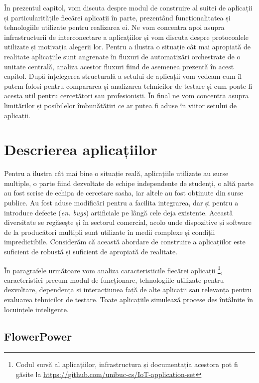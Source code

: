 În prezentul capitol, vom discuta despre modul de construire al suitei de aplicații și particularitățile fiecărei aplicații în parte, prezentând funcționalitatea și tehnologiile utilizate pentru realizarea ei. Ne vom concentra apoi asupra infrastructurii de interconectare a aplicațiilor și vom discuta despre protocoalele utilizate și motivația alegerii lor. Pentru a ilustra o situație cât mai apropiată de realitate aplicațiile sunt angrenate în fluxuri de automatizări orchestrate de o unitate centrală, analiza acestor fluxuri fiind de asemenea prezentă în acest capitol. După înțelegerea structurală a setului de aplicații vom vedeam cum îl putem folosi pentru compararea și analizarea tehnicilor de testare și cum poate fi acesta util pentru cercetători sau profesioniști. În final ne vom concentra asupra limitărilor și posibilelor îmbunătățiri ce ar putea fi aduse în viitor setului de aplicații.

\section{Descrierea aplicațiilor}

Pentru a ilustra cât mai bine o situație reală, aplicațiile utilizate au surse multiple, o parte fiind dezvoltate de echipe independente de studenți, o altă parte au fost scrise de echipa de cercetare \acrshort{sasha}, iar altele au fost obținute din surse publice. Au fost aduse modificări pentru a facilita integrarea, dar și pentru a introduce defecte (\textit{en. bugs}) artificiale pe lângă cele deja existente. Această diversitate se regăsește și în sectorul comercial, acolo unde dispozitive și software de la producători multipli sunt utilizate în medii complexe și condiții impredictibile. Considerăm că această abordare de construire a aplicațiilor este suficient de robustă și suficient de apropiată de realitate.

În paragrafele următoare vom analiza caracteristicile fiecărei aplicații \footnote{Codul sursă al aplicațiilor, infrastructura și documentația acestora pot fi găsite la \url{https://github.com/unibuc-cs/IoT-application-set}}, caracteristici precum modul de funcționare, tehnologiile utilizate pentru dezvoltare, dependența și interacțiunea față de alte aplicații sau relevanța pentru evaluarea tehnicilor de testare. Toate aplicațiile simulează procese des întâlnite în locuințele inteligente.

\subsection*{FlowerPower}

